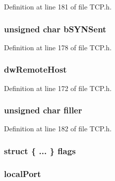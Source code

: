 Definition at line 181 of file T\+C\+P.\+h.

\hypertarget{struct_t_c_b_a5d60ed0da9975f201bdb5832564f24a2}{}
\subsubsection[{b\+S\+Y\+N\+Sent}]{\setlength{\rightskip}{0pt plus 5cm}unsigned char b\+S\+Y\+N\+Sent}\label{struct_t_c_b_a5d60ed0da9975f201bdb5832564f24a2}


Definition at line 178 of file T\+C\+P.\+h.

\hypertarget{struct_t_c_b_a3f09cd8c9167b802029195c759770966}{}
\subsubsection[{dw\+Remote\+Host}]{ dw\+Remote\+Host}\label{struct_t_c_b_a3f09cd8c9167b802029195c759770966}


Definition at line 172 of file T\+C\+P.\+h.

\hypertarget{struct_t_c_b_a3cc9af5814583d98e4724f5dfb86c5b8}{}
\subsubsection[{filler}]{\setlength{\rightskip}{0pt plus 5cm}unsigned char filler}\label{struct_t_c_b_a3cc9af5814583d98e4724f5dfb86c5b8}


Definition at line 182 of file T\+C\+P.\+h.

\hypertarget{struct_t_c_b_adc44e41369b7d7bebc66a88b5a289e72}{}
\subsubsection[{flags}]{\setlength{\rightskip}{0pt plus 5cm}struct \{ ... \}   flags}\label{struct_t_c_b_adc44e41369b7d7bebc66a88b5a289e72}
\hypertarget{struct_t_c_b_aa71085d8339f25c6ebce50737f9e58fb}{}
\subsubsection[{local\+Port}]{ local\+Port}\label{struct_t_c_b_aa71085d8339f25c6ebce50737f9e58fb}


